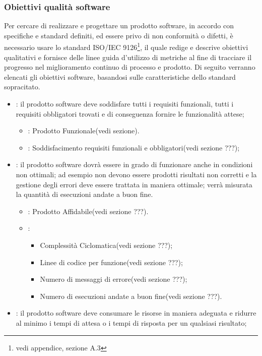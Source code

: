 \subsubsection{Obiettivi qualità software}
Per cercare di realizzare e progettare un prodotto software, in accordo con specifiche e standard definiti, ed essere privo di non conformità o difetti, è necessario usare lo standard ISO/IEC 9126\footnote{vedi appendice, sezione A.3}, il quale redige e descrive obiettivi qualitativi e fornisce delle linee guida d'utilizzo di metriche al fine di tracciare il progresso nel miglioramento continuo di processo e prodotto. 
Di seguito verranno elencati gli obiettivi software, basandosi sulle caratteristiche dello standard sopracitato. 
\begin{itemize}
\item {}: il prodotto software deve soddisfare tutti i requisiti funzionali, tutti i requisiti obbligatori trovati e di conseguenza fornire le funzionalità attese;
\begin{itemize}
\item {}: Prodotto Funzionale(vedi sezione).
\item {}: Soddisfacimento requisiti funzionali e obbligatori(vedi sezione ???);
\end{itemize}
\item {}: il prodotto software dovrà essere in grado di funzionare anche in condizioni non ottimali; ad esempio non devono essere prodotti risultati non corretti e la gestione degli errori deve essere trattata in maniera ottimale; verrà misurata la quantità di esecuzioni andate a buon fine.
\begin{itemize}
\item {}: Prodotto Affidabile(vedi sezione ???).
\item {}:
\begin{itemize}
\item Complessità Ciclomatica(vedi sezione ???);
\item Linee di codice per funzione(vedi sezione ???);
\item Numero di messaggi di errore(vedi sezione ???);
\item Numero di esecuzioni andate a buon fine(vedi sezione ???).
\end{itemize}
\end{itemize}
\item {}: il prodotto software deve consumare le risorse in maniera adeguata e ridurre al minimo i tempi di attesa o i tempi di risposta per un qualsiasi risultato;

\end{itemize}
